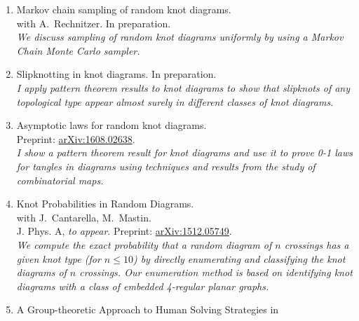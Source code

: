 \documentclass[letterpaper]{article}
\begin{document}
\begin{enumerate}
\item Markov chain sampling of random knot diagrams. \\
  with A.\ Rechnitzer. In preparation.\\
  \textit{We discuss sampling of random knot diagrams uniformly by
    using a Markov Chain Monte Carlo sampler.}
\item Slipknotting in knot diagrams.
  In preparation.\\
  \textit{I apply pattern theorem results to knot diagrams to show
    that slipknots of any topological type appear almost surely in
    different classes of knot diagrams.}
\item Asymptotic laws for random knot diagrams. \\
  Preprint: \href{http://arxiv.org/abs/1608.02638}{arXiv:1608.02638}.\\
  \textit{I show a pattern theorem result for knot diagrams and use it
    to prove 0-1 laws for tangles in diagrams using techniques and
    results from the study of combinatorial maps.}
\item Knot Probabilities in Random Diagrams.\\
  with J.\ Cantarella, M.\ Mastin. \\
  J. Phys. A, \textit{to appear}.
  Preprint: \href{http://arxiv.org/abs/1512.05749}{arXiv:1512.05749}.\\
  \textit{We compute the exact probability that a random diagram of
    $n$ crossings has a given knot type (for $n \leq 10$) by directly
    enumerating and classifying the knot diagrams of $n$
    crossings. Our enumeration method is based on identifying knot
    diagrams with a class of embedded 4-regular planar graphs.}
\item A Group-theoretic Approach to Human Solving Strategies in

\end{enumerate}
\end{document}
